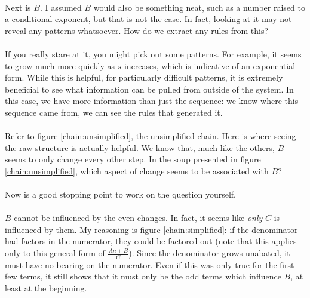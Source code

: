 \documentclass[12pt,letterpaper]{article}
\begin{document}
			\paragraph{} Next is $B$. I assumed $B$ would also be something neat, such as a number raised to a conditional exponent, but that is not the case. In fact, looking at it may not reveal any patterns whatsoever. How do we extract any rules from this?
			
			\paragraph{} If you really stare at it, you might pick out some patterns. For example, it seems to grow much more quickly as $s$ increases, which is indicative of an exponential form. While this is helpful, for particularly difficult patterns, it is extremely beneficial to see what information can be pulled from outside of the system. In this case, we have more information than just the sequence: we know where this sequence came from, we can see the rules that generated it.
			
			\paragraph{} Refer to figure \ref{chain:unsimplified}, the unsimplified chain. Here is where seeing the raw structure is actually helpful. We know that, much like the others, $B$ seems to only change every other step. In the soup presented in figure \ref{chain:unsimplified}, which aspect of change seems to be associated with $B$?
			
			\paragraph{} Now is a good stopping point to work on the question yourself.
			
			\paragraph{} $B$ cannot be influenced by the even changes. In fact, it seems like \textit{only} $C$ is influenced by them. My reasoning is figure \ref{chain:simplified}: if the denominator had factors in the numerator, they could be factored out (note that this applies only to this general form of $\frac{An + B}{C}$). Since the denominator grows unabated, it must have no bearing on the numerator. Even if this was only true for the first few terms, it still shows that it must only be the odd terms which influence $B$, at least at the beginning.
			
\end{document}
